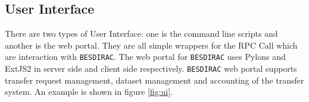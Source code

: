 \subsection{User Interface}
There are two types of User Interface: one is the command line scripts and 
another is the web portal. 
They are all simple wrappers for the RPC Call which are interaction
with {\tt BESDIRAC}.
The web portal for {\tt BESDIRAC} uses Pylons and ExtJS2 in server side and
client side respectively\cite{bib:webportal}. {\tt BESDIRAC} web portal supports
transfer request management, dataset management and  
accounting of the transfer system. An example is shown in figure
\ref{fig:ui}.
